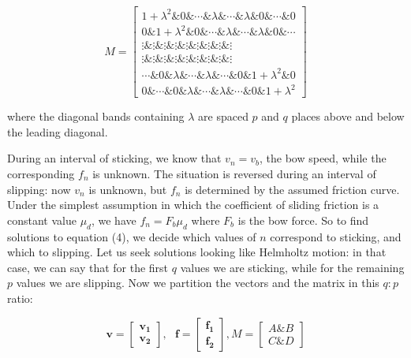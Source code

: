   \begin{equation*}M=\begin{bmatrix}1+\lambda^2 \& 0 \& \cdots \& \lambda \& 
  \cdots \& \lambda \& 0 \& \cdots \& 0\\0 \& 1+\lambda^2 \& 0 \& \cdots \& 
  \lambda \& \cdots \& \lambda \& 0 \& \cdots \\ \vdots \& \vdots \& \vdots \& 
  \vdots \& \vdots \& \vdots \& \vdots \& \vdots \& \vdots\\ \vdots \& \vdots 
  \& \vdots \& \vdots \& \vdots \& \vdots \& \vdots \& \vdots \& \vdots 
  \\\cdots \& 0 \& \lambda \& \cdots \& \lambda \& \cdots \& 0 \& 1+\lambda^2 
  \& 0\\0 \& \cdots \& 0 \& \lambda \& \cdots \& \lambda \& \cdots \& 0 \& 
  1+\lambda^2 \end{bmatrix} \tag{5}\end{equation*} 

  \noindent{}where the diagonal bands containing $\lambda$ are spaced $p$ and 
  $q$ places above and below the leading diagonal. 

  During an interval of sticking, we know that $v_n=v_b$, the bow speed, while 
  the corresponding $f_n$ is unknown. The situation is reversed during an 
  interval of slipping: now $v_n$ is unknown, but $f_n$ is determined by the 
  assumed friction curve. Under the simplest assumption in which the 
  coefficient of sliding friction is a constant value $\mu_d$, we have $f_n=F_b 
  \mu_d$ where $F_b$ is the bow force. So to find solutions to equation (4), we 
  decide which values of $n$ correspond to sticking, and which to slipping. Let 
  us seek solutions looking like Helmholtz motion: in that case, we can say 
  that for the first $q$ values we are sticking, while for the remaining $p$ 
  values we are slipping. Now we partition the vectors and the matrix in this 
  $q:p$ ratio: 

  \begin{equation*}\mathbf{v}=\begin{bmatrix} \mathbf{v_1}\\ 
  \mathbf{v_2}\end{bmatrix},~~~\mathbf{f}=\begin{bmatrix} \mathbf{f_1}\\ 
  \mathbf{f_2}\end{bmatrix}, M=\begin{bmatrix} A \& B \\ C \& D\end{bmatrix} 
  \tag{6}\end{equation*} 

